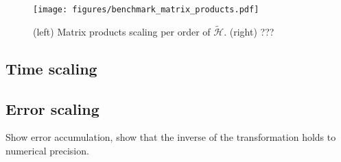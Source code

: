 \begin{figure}[h]
    \centering
    \texttt{[image: figures/benchmark\_matrix\_products.pdf]}
    \caption{
        (left) Matrix products scaling per order of $\tilde{\mathcal{H}}$.
        (right) ???
    }
    \label{fig:benchmark_matrix_products}
\end{figure}
\subsection{Time scaling}


\subsection{Error scaling}

Show error accumulation, show that the inverse of the transformation holds to numerical precision.
